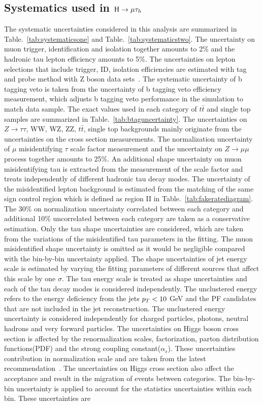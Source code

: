 \subsection{Systematics used in $\mathrm{H}\to \mu\tau_{h}$}
The systematic uncertainties considered in this analysis are summarized in Table.~\ref{tab:systematicsone} and Table.~\ref{tab:systematicstwo}. The uncertainty on muon trigger, identification and isolation together amounts  to 2\% and the hadronic tau lepton efficiency amounts to 5\%. The uncertainties on lepton selections that include trigger, ID, isolation efficiencies are estimated with tag and probe method with Z boson data sets~\cite{Khachatryan2011,Chatrchyan:2012xi,Khachatryan:2015hwa,Khachatryan:2015dfa,CMS:2016gvn}. The systematic uncertainty of b tagging veto is taken from the uncertainty of b tagging veto efficiency measurement, which adjusts b tagging veto performance in the simulation to match data sample. The exact values used in each category of $t\bar{t}$ and single top samples are summarized in Table.~\ref{tab:btaguncertainty}. The uncertainties on $Z\to\tau\tau$, WW, WZ, ZZ, $t\bar{t}$, single top backgrounds mainly originate from the uncertainties on the cross section measurements. The normalization uncertainty of $\mu$ misidentifying $\tau$ scale factor measurement and the uncertainty on $Z\to \mu\mu$ process together amounts to 25\%. An additional shape uncertainty on muon misidentifying tau is extracted from the measurement of the scale factor and treats independently of different hadronic tau decay modes. The uncertainty of the misidentified lepton background is estimated from the matching of the same sign control region which is defined as region II in Table.~\ref{tab:fakeratediagram}. The 30\% on normalization uncertainty correlated between each category and additional 10\% uncorrelated between each category are taken as a conservative estimation. Only the tau shape uncertainties are considered, which are taken from the variations of the misidentified tau parameters in the fitting. The muon misidentified shape uncertainty is omitted as it would be negligible compared with the bin-by-bin uncertainty applied.  The shape uncertainties of jet energy scale is estimated by varying the fitting parameters of different sources that affect this scale by one $\sigma$. The tau energy scale is treated as shape uncertainties and each of the tau decay modes is considered independently. The unclustered energy refers to the energy deficiency from the jets $p_{T}<10$ GeV and the PF candidates that are not included in the jet reconstruction. The unclustered energy uncertainty is considered independently for charged particles, photons, neutral hadrons and very forward particles.  The uncertainties on Higgs boson cross section is affected by the renormalization scales, factorization, parton distribution functions(PDF) and the strong coupling constant($\alpha_{s}$). These uncertainties contribution in normalization scale and are taken from the latest recommendation~\cite{YR4}. The uncertainties on Higgs cross section also affect the acceptance and result in the migration of events between categories.  The bin-by-bin uncertainty is applied to account for the statistics uncertainties within each bin. These uncertainties are 